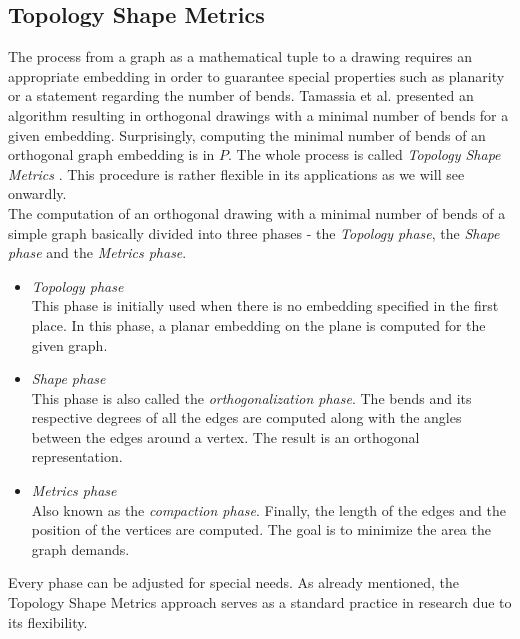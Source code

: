\subsection{Topology Shape Metrics}\label{def:topology_shape_metrics}
The process from a graph as a mathematical tuple to a drawing requires an appropriate embedding in order to guarantee special properties such as planarity or a statement regarding the number of bends. Tamassia et al. presented an algorithm resulting in orthogonal drawings with a minimal number of bends for a given embedding. Surprisingly, computing the minimal number of bends of an orthogonal graph embedding is in $P$. The whole process is called \textit{Topology Shape Metrics} \cite{Tamassia}. This procedure is rather flexible in its applications as we will see onwardly.\\
The computation of an orthogonal drawing with a minimal number of bends of a simple graph basically divided into three phases - the \textit{Topology phase}, the \textit{Shape phase} and the \textit{Metrics phase}.
\begin{itemize}
	\item \textit{Topology phase}\\
	This phase is initially used when there is no embedding specified in the first place. In this phase, a planar embedding on the plane is computed for the given graph.
	\item \textit{Shape phase}\\
	This phase is also called the \textit{orthogonalization phase}. The bends and its respective degrees of all the edges are computed along with the angles between the edges around a vertex. The result is an orthogonal representation.
	\item \textit{Metrics phase}\\
	Also known as the \textit{compaction phase}. Finally, the length of the edges and the position of the vertices are computed. The goal is to minimize the area the graph demands.
\end{itemize}
Every phase can be adjusted for special needs. As already mentioned, the Topology Shape Metrics approach serves as a standard practice in research due to its flexibility.\cite{podevsaef}

